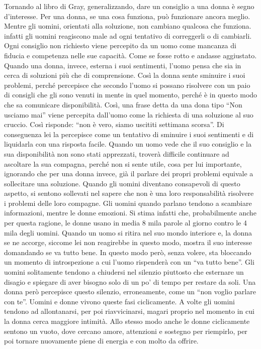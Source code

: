 \documentclass[12pt]{book} %
\begin{document}
Tornando al libro di Gray, generalizzando, dare un consiglio a una donna è segno d'interesse. Per una donna, se una cosa funziona, può
funzionare ancora meglio. Mentre gli uomini, orientati alla soluzione, non cambiano qualcosa che funziona. infatti gli
uomini reagiscono male ad ogni tentativo di correggerli o di cambiarli. Ogni consiglio non richiesto viene percepito da
un uomo come mancanza di fiducia e competenza nelle sue capacità. Come se fosse rotto e andasse aggiustato. Quando una
donna, invece, esterna i suoi sentimenti, l'uomo pensa che sia in cerca di soluzioni più che di
comprensione. Così la donna sente sminuire i suoi problemi, perché percepisce che secondo l'uomo
si possano risolvere con un paio di consigli che gli sono venuti in mente in quel momento, perché è in questo modo
che sa comunicare disponibilità. Così, una frase detta da una dona tipo “Non usciamo mai” viene
percepita dall'uomo come la richiesta di una soluzione al suo cruccio. Così risponde: “non è vero,
siamo uscititi settimana scorsa”. Di conseguenza lei la percepisce come un tentativo di sminuire i suoi sentimenti e di
liquidarla con una risposta facile. Quando un uomo vede che il suo consiglio e la sua disponibilità non sono stati
apprezzati, troverà difficile continuare ad ascoltare la sua compagna, perché non si sente utile, cosa per lui
importante, ignorando che per una donna invece, già il parlare dei propri problemi equivale a sollecitare una soluzione.
Quando gli uomini diventano consapevoli di questo aspetto, si sentono sollevati nel sapere che non è una loro
responsabilità risolvere i problemi delle loro compagne. Gli uomini quando parlano tendono a scambiare informazioni,
mentre le donne emozioni. Si stima infatti che, probabilmente anche per questa ragione, le donne usano in media 8
mila parole al giorno contro le 4 mila degli uomini. Quando un uomo si ritira nel suo mondo interiore e, la donna se ne accorge,
siccome lei non reagirebbe in questo modo, mostra il suo interesse domandando se va tutto bene. In questo modo però, senza volere, sta bloccando un momento di introspezione a cui l'uomo rispenderà con un “va
tutto bene”. Gli uomini solitamente tendono a chiudersi nel silenzio piuttosto che esternare un disagio e spiegare di
aver bisogno solo di un po' di tempo per restare da soli. Una donna però percepisce questo silenzio, erroneamente, come
un “non voglio parlare con te”. Uomini e donne vivono queste fasi ciclicamente. A volte gli uomini tendono ad
allontanarsi, per poi riavvicinarsi, magari proprio nel momento in cui la donna cerca maggiore intimità. Allo stesso
modo anche le donne ciclicamente sentono un vuoto, dove cercano amore, attenzioni e sostegno per riempirlo, per poi
tornare nuovamente piene di energia e con molto da offrire. 
\end{document}

